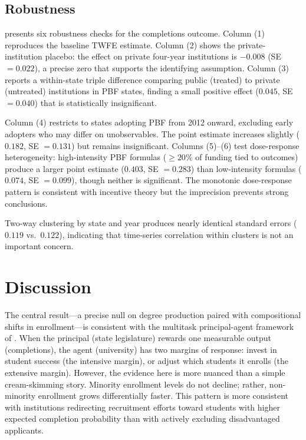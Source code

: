 \documentclass[12pt]{article}
\begin{document}
\subsection{Robustness}



 presents six robustness checks for the completions outcome. Column (1) reproduces the baseline TWFE estimate. Column (2) shows the private-institution placebo: the effect on private four-year institutions is $-0.008$ (SE $= 0.022$), a precise zero that supports the identifying assumption. Column (3) reports a within-state triple difference comparing public (treated) to private (untreated) institutions in PBF states, finding a small positive effect ($0.045$, SE $= 0.040$) that is statistically insignificant.

Column (4) restricts to states adopting PBF from 2012 onward, excluding early adopters who may differ on unobservables. The point estimate increases slightly ($0.182$, SE $= 0.131$) but remains insignificant. Columns (5)--(6) test dose-response heterogeneity: high-intensity PBF formulas ($\geq 20$\% of funding tied to outcomes) produce a larger point estimate ($0.403$, SE $= 0.283$) than low-intensity formulas ($0.074$, SE $= 0.099$), though neither is significant. The monotonic dose-response pattern is consistent with incentive theory but the imprecision prevents strong conclusions.

Two-way clustering by state and year produces nearly identical standard errors ($0.119$ vs.\ $0.122$), indicating that time-series correlation within clusters is not an important concern.

\section{Discussion}

The central result---a precise null on degree production paired with compositional shifts in enrollment---is consistent with the multitask principal-agent framework of \citet{holmstrom1991multitask}. When the principal (state legislature) rewards one measurable output (completions), the agent (university) has two margins of response: invest in student success (the intensive margin), or adjust which students it enrolls (the extensive margin). However, the evidence here is more nuanced than a simple cream-skimming story. Minority enrollment levels do not decline; rather, non-minority enrollment grows differentially faster. This pattern is more consistent with institutions redirecting recruitment efforts toward students with higher expected completion probability than with actively excluding disadvantaged applicants.
\end{document}
